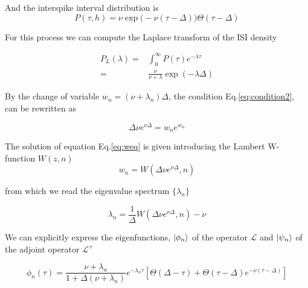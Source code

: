 \documentclass[12pt,twoside]{report}
\begin{document}
And the interspike interval distribution is 
\begin{equation}
P(\tau,h)=\nu\exp\big(-\nu(\tau-\Delta)\big) \Theta(\tau-\Delta) 
\end{equation}


For this process we can compute the Laplace transform of the ISI density

\begin{align}
P_L(\lambda)=&\int_0^\infty P(\tau)e^{-\lambda \tau}\nonumber\\
=&\frac{\nu}{\nu+\lambda}\exp(-\lambda \Delta)
\end{align}


By the change of variable $w_n=(\nu+\lambda_n)\Delta$, the condition Eq.\eqref{eq:condition2}, can be rewritten as


\begin{equation}
\label{eq:weq}
\Delta \nu e^{\nu\Delta}=w_ne^{w_n} 
\end{equation}

The solution of equation Eq.\eqref{eq:weq} is given introducing the Lambert W-function $W(z,n)$
\begin{equation}
w_n=W(\Delta \nu e^{\nu\Delta},n)
\end{equation}

from which we read the eigenvalue spectrum $\{\lambda_n\}$

\begin{equation}
\lambda_n=\frac{1}{\Delta}W(\Delta \nu e^{\nu\Delta},n) - \nu
\end{equation}


We can explicitly express the eigenfunctions, $\ket{\phi_n}$ of the operator $\mathcal{L}$ and $\ket{\psi_n}$ of  the adjoint operator $\mathcal{L}^+$


\begin{equation}
\phi_n(\tau)= \frac{\nu+\lambda_n}{1+\Delta(\nu+\lambda_n)}e^{-\lambda_n\tau}\left[\Theta(\Delta-\tau) +  \Theta(\tau-\Delta)e^{-\nu(\tau-\Delta)}\right]
\end{equation}
\end{document}
